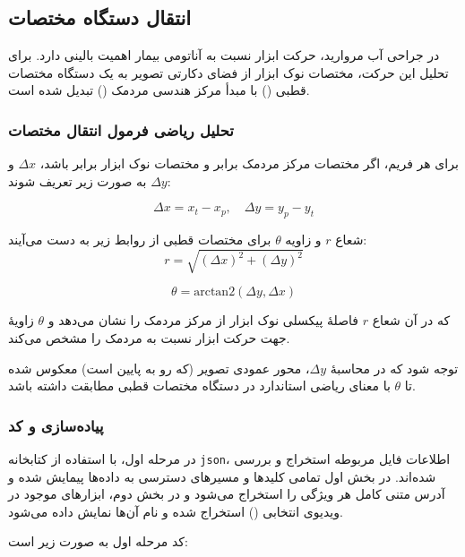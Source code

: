 \documentclass{article}
\begin{document}
\subsection{انتقال دستگاه مختصات}

در جراحی آب مروارید، حرکت ابزار نسبت به آناتومی بیمار اهمیت بالینی دارد. برای تحلیل این حرکت، مختصات نوک ابزار از فضای دکارتی تصویر به یک دستگاه مختصات قطبی () با مبدأ مرکز هندسی مردمک () تبدیل شده است.

\subsubsection{تحلیل ریاضی فرمول انتقال مختصات}

برای هر فریم، اگر مختصات مرکز مردمک برابر  و مختصات نوک ابزار برابر  باشد، $\Delta x$ و $\Delta y$ به صورت زیر تعریف شوند:

\[
\Delta x = x_{t} - x_{p}, \quad \Delta y = y_{p} - y_{t}
\]

شعاع $r$ و زاویه $\theta$ برای مختصات قطبی از روابط زیر به دست می‌آیند:
\[
r = \sqrt{(\Delta x)^{2} + (\Delta y)^{2}}
\]

\[
\theta = \mathrm{arctan2}(\Delta y, \Delta x)
\]

که در آن شعاع $r$ فاصلۀ پیکسلی نوک ابزار از مرکز مردمک را نشان می‌دهد و $\theta$ زاویۀ جهت حرکت ابزار نسبت به مردمک را مشخص می‌کند.

توجه شود که در محاسبۀ $\Delta y$، محور عمودی تصویر (که رو به پایین است) معکوس شده تا $\theta$ با معنای ریاضی استاندارد در دستگاه مختصات قطبی مطابقت داشته باشد. 

\subsubsection{پیاده‌سازی و کد}

در مرحله اول، با استفاده از کتابخانه \texttt{json}، اطلاعات فایل  مربوطه استخراج و بررسی شده‌اند. در بخش اول تمامی کلیدها و مسیرهای دسترسی به داده‌ها پیمایش شده و آدرس متنی کامل هر ویژگی را استخراج می‌شود و در بخش دوم، ابزارهای موجود در ویدیوی انتخابی () استخراج شده و نام آن‌ها نمایش داده می‌شود. 

کد مرحله اول به صورت زیر است:
\end{document}
